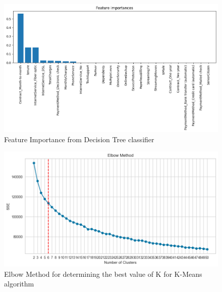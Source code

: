 \documentclass[a4paper,11pt]{article}
\begin{document}
\begin{figure}
    \centering
    \includegraphics[width=\linewidth]{figures/classification/feature_importance_dt.png}
    \caption{Feature Importance from Decision Tree classifier}
    \label{fig:dt_ft}
\end{figure}

\begin{figure}
    \centering
    \includegraphics[width=\linewidth]{figures/clustering/elbow.png}
    \caption{Elbow Method for determining the best value of K for K-Means algorithm}
    \label{fig:km}
\end{figure}
\end{document}
